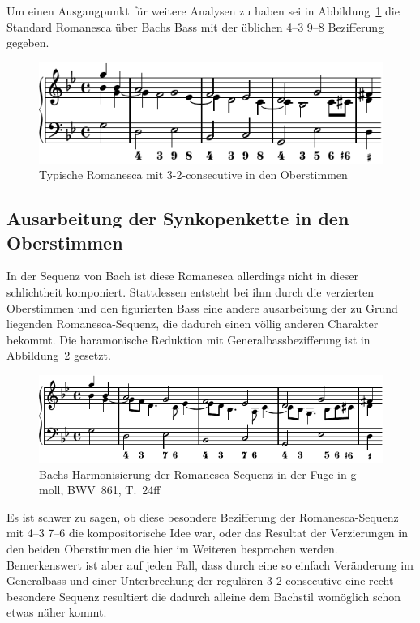 Um einen Ausgangpunkt für weitere Analysen zu haben sei in Abbildung~\ref{fig:bwv681-romanesca-standard} die Standard Romanesca über Bachs Bass mit der üblichen 4--3 9--8 Bezifferung gegeben.

\begin{figure}[htbp]
	\centering
	\includegraphics{lilypond/g-moll/render/romanesca-standard}
	\caption{Typische Romanesca mit 3-2-consecutive in den Oberstimmen}
	\label{fig:bwv681-romanesca-standard}
\end{figure}


\subsection{Ausarbeitung der Synkopenkette in den Oberstimmen}

In der Sequenz von Bach ist diese Romanesca allerdings nicht in dieser schlichtheit komponiert.
Stattdessen entsteht bei ihm durch die verzierten Oberstimmen und den figurierten Bass eine andere ausarbeitung der zu Grund liegenden Romanesca-Sequenz, die dadurch einen völlig anderen Charakter bekommt.
Die haramonische Reduktion mit Generalbassbezifferung ist in Abbildung~\ref{fig:bwv681-vorhalte} gesetzt.

\begin{figure}[htbp]
	\centering
	\includegraphics{lilypond/g-moll/render/romanesca-vorhalte}
	\caption{Bachs Harmonisierung der Romanesca-Sequenz in der Fuge in g-moll, BWV~861, T.~24ff}
	\label{fig:bwv681-vorhalte}
\end{figure}

Es ist schwer zu sagen, ob diese besondere Bezifferung der Romanesca-Sequenz mit 4--3 7--6 die kompositorische Idee war, oder das Resultat der Verzierungen in den beiden Oberstimmen die hier im Weiteren besprochen werden.
Bemerkenswert ist aber auf jeden Fall, dass durch eine so einfach Veränderung im Generalbass und einer Unterbrechung der regulären 3-2-consecutive eine recht besondere Sequenz resultiert die dadurch alleine dem Bachstil womöglich schon etwas näher kommt.

